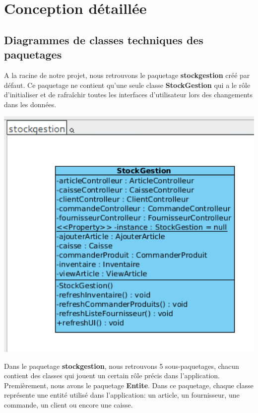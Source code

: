 \chapter{Conception détaillée}

\section{Diagrammes de classes techniques des paquetages}

A la racine de notre projet, nous retrouvons le paquetage \textbf{stockgestion} créé par défaut. Ce paquetage ne contient qu'une seule classe \textbf{StockGestion} qui a le rôle d'initialiser et de rafraîchir toutes les interfaces d'utilisateur lors des changements dans les données.

\begin{center}
\includegraphics[width=14cm]{./Conception/stockgestion}
\end{center}

Dans le paquetage \textbf{stockgestion}, nous retrouvons 5 sous-paquetages, chacun contient des classes qui jouent un certain rôle précis dans l'application.\\

Premièrement, nous avons le paquetage \textbf{Entite}. Dans ce paquetage, chaque classe représente une entité utilisé dans l'application: un article, un fournisseur, une commande, un client ou encore une caisse.

